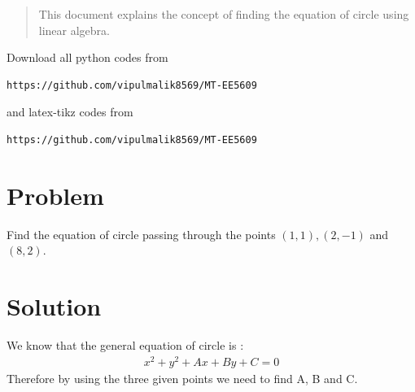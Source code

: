 \documentclass[journal,12pt,twocolumn]{IEEEtran}
\begin{document}
\date{\today}

\maketitle
\newpage
\bigskip
\renewcommand{\thefigure}{\theenumi}
\renewcommand{\thetable}{\theenumi}

\begin{abstract}
This document explains the concept of finding the equation of circle using linear algebra.
\end{abstract}
Download all python codes from 
\begin{lstlisting}
https://github.com/vipulmalik8569/MT-EE5609
\end{lstlisting}
and latex-tikz codes from 
\begin{lstlisting}
https://github.com/vipulmalik8569/MT-EE5609
\end{lstlisting}
\section{\textbf{Problem}}
Find the equation of circle passing through the points $(1,1), (2,-1)$ and $(8,2)$.
\section{\textbf{Solution}}
We know that the general equation of circle is :
\begin{align}
x^2+y^2+Ax+By+C=0\label{eq:1}
\end{align}
Therefore by using the three given points we need to find A, B and C. 
\end{document}

